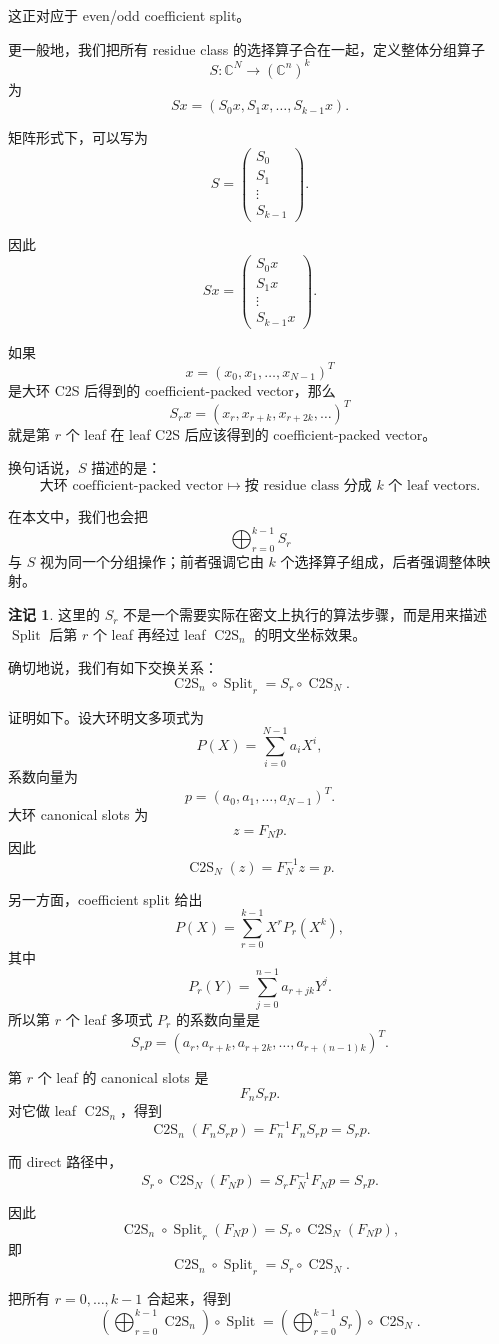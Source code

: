 \documentclass[UTF8,11pt]{ctexart}
\theoremstyle{definition}
\newtheorem{remark}{注记}
\newcommand{\CtwoS}{\operatorname{C2S}}
\newcommand{\Split}{\operatorname{Split}}
\begin{document}
这正对应于 even/odd coefficient split。

更一般地，我们把所有 residue class 的选择算子合在一起，定义整体分组算子
\[
S:\mathbb{C}^N\to (\mathbb{C}^n)^k
\]
为
\[
Sx
=
(S_0x,S_1x,\ldots,S_{k-1}x).
\]

矩阵形式下，可以写为
\[
S=
\begin{pmatrix}
S_0\\
S_1\\
\vdots\\
S_{k-1}
\end{pmatrix}.
\]

因此
\[
Sx=
\begin{pmatrix}
S_0x\\
S_1x\\
\vdots\\
S_{k-1}x
\end{pmatrix}.
\]

如果
\[
x=(x_0,x_1,\ldots,x_{N-1})^T
\]
是大环 C2S 后得到的 coefficient-packed vector，那么
\[
S_rx=(x_r,x_{r+k},x_{r+2k},\ldots)^T
\]
就是第 \(r\) 个 leaf 在 leaf C2S 后应该得到的 coefficient-packed vector。

换句话说，\(S\) 描述的是：
\[
\text{大环 coefficient-packed vector}
\longmapsto
\text{按 residue class 分成 }k\text{ 个 leaf vectors}.
\]

在本文中，我们也会把
\[
\bigoplus_{r=0}^{k-1}S_r
\]
与 \(S\) 视为同一个分组操作；前者强调它由 \(k\) 个选择算子组成，后者强调整体映射。

\begin{remark}
    
    这里的 \(S_r\) 不是一个需要实际在密文上执行的算法步骤，而是用来描述
\(\Split\) 后第 \(r\) 个 leaf 再经过 leaf \(\CtwoS_n\) 的明文坐标效果。

确切地说，我们有如下交换关系：
\[
\boxed{
\CtwoS_n\circ \Split_r
=
S_r\circ \CtwoS_N.
}
\]

证明如下。设大环明文多项式为
\[
P(X)=\sum_{i=0}^{N-1}a_iX^i,
\]
系数向量为
\[
p=(a_0,a_1,\ldots,a_{N-1})^T.
\]
大环 canonical slots 为
\[
z=F_Np.
\]
因此
\[
\CtwoS_N(z)=F_N^{-1}z=p.
\]

另一方面，coefficient split 给出
\[
P(X)=\sum_{r=0}^{k-1}X^rP_r(X^k),
\]
其中
\[
P_r(Y)=\sum_{j=0}^{n-1}a_{r+jk}Y^j.
\]
所以第 \(r\) 个 leaf 多项式 \(P_r\) 的系数向量是
\[
S_rp=(a_r,a_{r+k},a_{r+2k},\ldots,a_{r+(n-1)k})^T.
\]

第 \(r\) 个 leaf 的 canonical slots 是
\[
F_nS_rp.
\]
对它做 leaf \(\CtwoS_n\)，得到
\[
\CtwoS_n(F_nS_rp)
=
F_n^{-1}F_nS_rp
=
S_rp.
\]

而 direct 路径中，
\[
S_r\circ \CtwoS_N(F_Np)
=
S_rF_N^{-1}F_Np
=
S_rp.
\]

因此
\[
\CtwoS_n\circ \Split_r(F_Np)
=
S_r\circ\CtwoS_N(F_Np),
\]
即
\[
\boxed{
\CtwoS_n\circ \Split_r
=
S_r\circ \CtwoS_N.
}
\]

把所有 \(r=0,\ldots,k-1\) 合起来，得到
\[
\boxed{
\left(
\bigoplus_{r=0}^{k-1}\CtwoS_n
\right)
\circ
\Split
=
\left(
\bigoplus_{r=0}^{k-1}S_r
\right)
\circ
\CtwoS_N.
}
\]

\end{remark}
\end{document}
